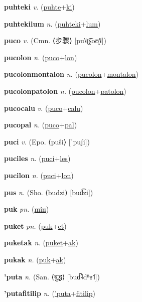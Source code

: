 \textbf{\hypertarget{puhteki}{puhteki}} \textit{v.} (\hyperlink{puhte}{puhte}+\allowbreak \hyperlink{ki}{ki})


\textbf{\hypertarget{puhtekilum}{puhtekilum}} \textit{n.} (\hyperlink{puhteki}{puhteki}+\allowbreak \hyperlink{lum}{lum})


\textbf{\hypertarget{puco}{puco}} \textit{v.} (Cmn. ⟨{\chinese{}步骤}⟩ [pu˥˩ʈ͡ʂoʊ̯˥˩])


\textbf{\hypertarget{pucolon}{pucolon}} \textit{n.} (\hyperlink{puco}{puco}+\allowbreak \hyperlink{lon}{lon})


\textbf{\hypertarget{pucolonmontalon}{pucolonmontalon}} \textit{n.} (\hyperlink{pucolon}{pucolon}+\allowbreak \hyperlink{montalon}{montalon})


\textbf{\hypertarget{pucolonpatolon}{pucolonpatolon}} \textit{n.} (\hyperlink{pucolon}{pucolon}+\allowbreak \hyperlink{patolon}{patolon})


\textbf{\hypertarget{pucocalu}{pucocalu}} \textit{v.} (\hyperlink{puco}{puco}+\allowbreak \hyperlink{calu}{calu})


\textbf{\hypertarget{pucopal}{pucopal}} \textit{n.} (\hyperlink{puco}{puco}+\allowbreak \hyperlink{pal}{pal})


\textbf{\hypertarget{puci}{puci}} \textit{v.} (Epo. ⟨puŝi⟩ [ˈpuʃi])


\textbf{\hypertarget{puciles}{puciles}} \textit{n.} (\hyperlink{puci}{puci}+\allowbreak \hyperlink{les}{les})


\textbf{\hypertarget{pucilon}{pucilon}} \textit{n.} (\hyperlink{puci}{puci}+\allowbreak \hyperlink{lon}{lon})


\textbf{\hypertarget{pus}{pus}} \textit{n.} (Sho. ⟨budzi⟩ [bud͡zi])


\textbf{\hypertarget{puk}{puk}} \textit{pn.} (\hyperlink{min}{\sout{min}})


\textbf{\hypertarget{puket}{puket}} \textit{pn.} (\hyperlink{puk}{puk}+\allowbreak \hyperlink{et}{et})


\textbf{\hypertarget{puketak}{puketak}} \textit{n.} (\hyperlink{puket}{puket}+\allowbreak \hyperlink{ak}{ak})


\textbf{\hypertarget{pukak}{pukak}} \textit{n.} (\hyperlink{puk}{puk}+\allowbreak \hyperlink{ak}{ak})


\textbf{\hypertarget{'puta}{'puta}} \textit{n.} (San. ⟨{\devanagari{}बुद्ध}⟩ [bud̚˨dʱɐ˦])


\textbf{\hypertarget{'putafitilip}{'putafitilip}} \textit{n.} (\hyperlink{'puta}{'puta}+\allowbreak \hyperlink{fitilip}{fitilip})


